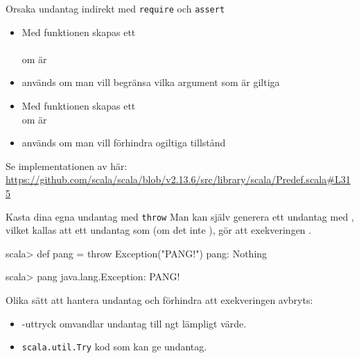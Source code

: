 \begin{Slide}{Orsaka undantag indirekt med \texttt{require} och \texttt{assert}}

\begin{itemize}\SlideFontSmall
  \item Med funktionen  skapas ett \\ \\ om  är 
  \item {} används om man vill begränsa vilka argument som är giltiga
  \item Med funktionen  skapas ett  \\ om  är  
  \item {} används om man vill förhindra ogiltiga tillstånd
\end{itemize}
{
  \ifkompendium\else
  \vfill\SlideFontTiny
  \fi
  Se implementationen av  här:\\
\url{https://github.com/scala/scala/blob/v2.13.6/src/library/scala/Predef.scala#L315}
}
\end{Slide}

\begin{Slide}{Kasta dina egna undantag med \texttt{throw}}\SlideFontSmall
Man kan själv generera ett undantag med , vilket kallas att  ett undantag som (om det inte ), gör att exekveringen .


\begin{REPL}
scala> def pang = throw Exception("PANG!")
pang: Nothing

scala> pang
java.lang.Exception: PANG!

\end{REPL}
\pause
Olika sätt att hantera undantag och förhindra att exekveringen avbryts:
\begin{itemize}
\item {}-uttryck omvandlar undantag till ngt lämpligt värde.

\item \texttt{scala.util.Try}  kod som kan ge undantag.  %
\end{itemize}
\end{Slide}


